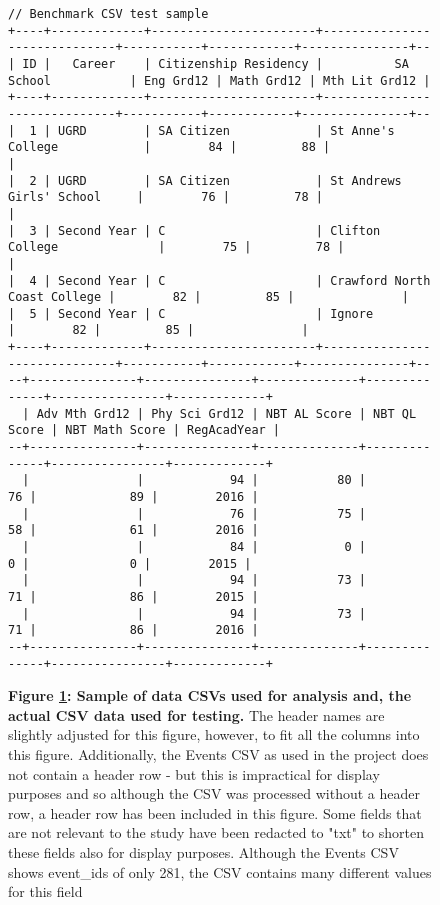 \begin{figure}[H]
\begin{mdframed}[rightline=true,leftline=true]
\begin{BVerbatim}[fontsize=\tiny]
// Benchmark CSV test sample
+----+-------------+-----------------------+------------------------------+-----------+------------+---------------+--
| ID |   Career    | Citizenship Residency |          SA School           | Eng Grd12 | Math Grd12 | Mth Lit Grd12 |
+----+-------------+-----------------------+------------------------------+-----------+------------+---------------+--
|  1 | UGRD        | SA Citizen            | St Anne's College            |        84 |         88 |               |
|  2 | UGRD        | SA Citizen            | St Andrews Girls' School     |        76 |         78 |               |
|  3 | Second Year | C                     | Clifton College              |        75 |         78 |               |
|  4 | Second Year | C                     | Crawford North Coast College |        82 |         85 |               |
|  5 | Second Year | C                     | Ignore                       |        82 |         85 |               |
+----+-------------+-----------------------+------------------------------+-----------+------------+---------------+--
--+---------------+---------------+--------------+--------------+----------------+-------------+
  | Adv Mth Grd12 | Phy Sci Grd12 | NBT AL Score | NBT QL Score | NBT Math Score | RegAcadYear |
--+---------------+---------------+--------------+--------------+----------------+-------------+
  |               |            94 |           80 |           76 |             89 |        2016 |
  |               |            76 |           75 |           58 |             61 |        2016 |
  |               |            84 |            0 |            0 |              0 |        2015 |
  |               |            94 |           73 |           71 |             86 |        2015 |
  |               |            94 |           73 |           71 |             86 |        2016 |
--+---------------+---------------+--------------+--------------+----------------+-------------+

        \end{BVerbatim}
    \end{mdframed}
    \caption[CSV Samples]{\textbf{Figure \ref{fig-sample-csv-files}: Sample of data CSVs used for analysis and, the actual CSV data used for testing.} The header names are slightly adjusted for this figure, however, to fit all the columns into this figure. Additionally, the Events CSV as used in the project does not contain a header row - but this is impractical for display purposes and so although the CSV was processed without a header row, a header row has been included in this figure. Some fields that are not relevant to the study have been redacted to "txt" to shorten these fields also for display purposes. Although the Events CSV shows event\_ids of only 281, the CSV contains many different values for this field}
    \label{fig-sample-csv-files}
\end{figure}
